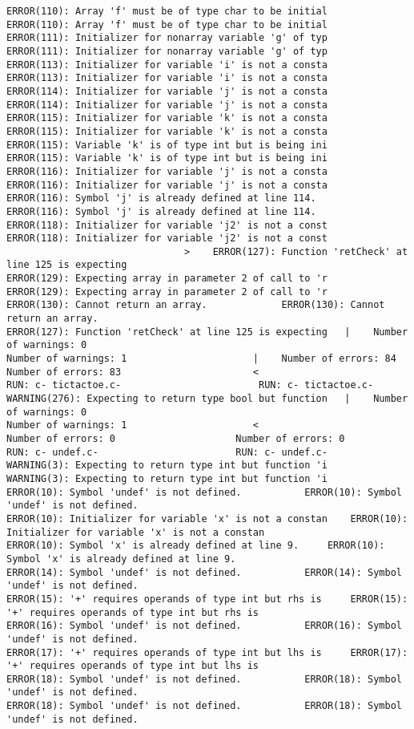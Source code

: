 \documentclass[12pt]{book}
\begin{document}
\begin{lstlisting}
ERROR(110): Array 'f' must be of type char to be initial	ERROR(110): Array 'f' must be of type char to be initial
ERROR(111): Initializer for nonarray variable 'g' of typ	ERROR(111): Initializer for nonarray variable 'g' of typ
ERROR(113): Initializer for variable 'i' is not a consta	ERROR(113): Initializer for variable 'i' is not a consta
ERROR(114): Initializer for variable 'j' is not a consta	ERROR(114): Initializer for variable 'j' is not a consta
ERROR(115): Initializer for variable 'k' is not a consta	ERROR(115): Initializer for variable 'k' is not a consta
ERROR(115): Variable 'k' is of type int but is being ini	ERROR(115): Variable 'k' is of type int but is being ini
ERROR(116): Initializer for variable 'j' is not a consta	ERROR(116): Initializer for variable 'j' is not a consta
ERROR(116): Symbol 'j' is already defined at line 114.		ERROR(116): Symbol 'j' is already defined at line 114.
ERROR(118): Initializer for variable 'j2' is not a const	ERROR(118): Initializer for variable 'j2' is not a const
							   >	ERROR(127): Function 'retCheck' at line 125 is expecting
ERROR(129): Expecting array in parameter 2 of call to 'r	ERROR(129): Expecting array in parameter 2 of call to 'r
ERROR(130): Cannot return an array.				ERROR(130): Cannot return an array.
ERROR(127): Function 'retCheck' at line 125 is expecting   |	Number of warnings: 0
Number of warnings: 1					   |	Number of errors: 84
Number of errors: 83					   <
RUN: c- tictactoe.c-						RUN: c- tictactoe.c-
WARNING(276): Expecting to return type bool but function   |	Number of warnings: 0
Number of warnings: 1					   <
Number of errors: 0						Number of errors: 0
RUN: c- undef.c-						RUN: c- undef.c-
WARNING(3): Expecting to return type int but function 'i	WARNING(3): Expecting to return type int but function 'i
ERROR(10): Symbol 'undef' is not defined.			ERROR(10): Symbol 'undef' is not defined.
ERROR(10): Initializer for variable 'x' is not a constan	ERROR(10): Initializer for variable 'x' is not a constan
ERROR(10): Symbol 'x' is already defined at line 9.		ERROR(10): Symbol 'x' is already defined at line 9.
ERROR(14): Symbol 'undef' is not defined.			ERROR(14): Symbol 'undef' is not defined.
ERROR(15): '+' requires operands of type int but rhs is 	ERROR(15): '+' requires operands of type int but rhs is 
ERROR(16): Symbol 'undef' is not defined.			ERROR(16): Symbol 'undef' is not defined.
ERROR(17): '+' requires operands of type int but lhs is 	ERROR(17): '+' requires operands of type int but lhs is 
ERROR(18): Symbol 'undef' is not defined.			ERROR(18): Symbol 'undef' is not defined.
ERROR(18): Symbol 'undef' is not defined.			ERROR(18): Symbol 'undef' is not defined.

\end{lstlisting}
\end{document}
